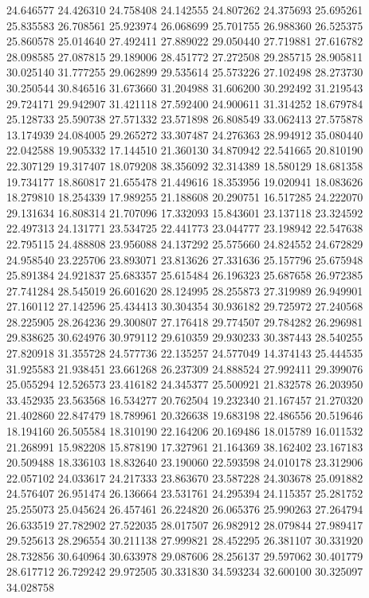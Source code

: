 24.646577
24.426310
24.758408
24.142555
24.807262
24.375693
25.695261
25.835583
26.708561
25.923974
26.068699
25.701755
26.988360
26.525375
25.860578
25.014640
27.492411
27.889022
29.050440
27.719881
27.616782
28.098585
27.087815
29.189006
28.451772
27.272508
29.285715
28.905811
30.025140
31.777255
29.062899
29.535614
25.573226
27.102498
28.273730
30.250544
30.846516
31.673660
31.204988
31.606200
30.292492
31.219543
29.724171
29.942907
31.421118
27.592400
24.900611
31.314252
18.679784
25.128733
25.590738
27.571332
23.571898
26.808549
33.062413
27.575878
13.174939
24.084005
29.265272
33.307487
24.276363
28.994912
35.080440
22.042588
19.905332
17.144510
21.360130
34.870942
22.541665
20.810190
22.307129
19.317407
18.079208
38.356092
32.314389
18.580129
18.681358
19.734177
18.860817
21.655478
21.449616
18.353956
19.020941
18.083626
18.279810
18.254339
17.989255
21.188608
20.290751
16.517285
24.222070
29.131634
16.808314
21.707096
17.332093
15.843601
23.137118
23.324592
22.497313
24.131771
23.534725
22.441773
23.044777
23.198942
22.547638
22.795115
24.488808
23.956088
24.137292
25.575660
24.824552
24.672829
24.958540
23.225706
23.893071
23.813626
27.331636
25.157796
25.675948
25.891384
24.921837
25.683357
25.615484
26.196323
25.687658
26.972385
27.741284
28.545019
26.601620
28.124995
28.255873
27.319989
26.949901
27.160112
27.142596
25.434413
30.304354
30.936182
29.725972
27.240568
28.225905
28.264236
29.300807
27.176418
29.774507
29.784282
26.296981
29.838625
30.624976
30.979112
29.610359
29.930233
30.387443
28.540255
27.820918
31.355728
24.577736
22.135257
24.577049
14.374143
25.444535
31.925583
21.938451
23.661268
26.237309
24.888524
27.992411
29.399076
25.055294
12.526573
23.416182
24.345377
25.500921
21.832578
26.203950
33.452935
23.563568
16.534277
20.762504
19.232340
21.167457
21.270320
21.402860
22.847479
18.789961
20.326638
19.683198
22.486556
20.519646
18.194160
26.505584
18.310190
22.164206
20.169486
18.015789
16.011532
21.268991
15.982208
15.878190
17.327961
21.164369
38.162402
23.167183
20.509488
18.336103
18.832640
23.190060
22.593598
24.010178
23.312906
22.057102
24.033617
24.217333
23.863670
23.587228
24.303678
25.091882
24.576407
26.951474
26.136664
23.531761
24.295394
24.115357
25.281752
25.255073
25.045624
26.457461
26.224820
26.065376
25.990263
27.264794
26.633519
27.782902
27.522035
28.017507
26.982912
28.079844
27.989417
29.525613
28.296554
30.211138
27.999821
28.452295
26.381107
30.331920
28.732856
30.640964
30.633978
29.087606
28.256137
29.597062
30.401779
28.617712
26.729242
29.972505
30.331830
34.593234
32.600100
30.325097
34.028758
